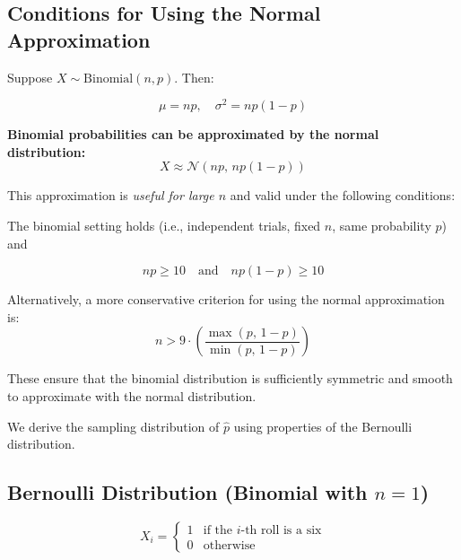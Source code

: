 \subsection*{Conditions for Using the Normal Approximation}

\vspace{0.5em}

Suppose \( X \sim \text{Binomial}(n, p) \). Then:

\[
\mu = np, \quad \sigma^2 = np(1 - p)
\]

\medskip

\textbf{Binomial probabilities can be approximated by the normal distribution:}
\[
X \approx \mathcal{N}(np, \, np(1 - p))
\]

This approximation is \textit{useful for large \( n \)} and valid under the following conditions:

\begin{tcolorbox}[title=Standard Conditions,
  colback=blue!5, 
  colframe=blue!50!black, 
  coltitle=black,
  colbacktitle=blue!20, %
  fonttitle=\bfseries,
  sharp corners=south,
  boxrule=0.5pt,
  enhanced,
  width=\textwidth,
  breakable]
The binomial setting holds (i.e., independent trials, fixed \( n \), same probability \( p \)) and

\[
np \geq 10 \quad \text{and} \quad np(1 - p) \geq 10
\]
\end{tcolorbox}

\vspace{0.5em}

Alternatively, a more conservative criterion for using the normal approximation is:
\[
n > 9 \cdot \left( \frac{\max(p, \, 1 - p)}{\min(p, \, 1 - p)} \right)
\]

\medskip

These ensure that the binomial distribution is sufficiently symmetric and smooth to approximate with the normal distribution.

\medskip
We derive the sampling distribution of \( \hat{p} \) using properties of the Bernoulli distribution.

\subsection*{Bernoulli Distribution (Binomial with $n = 1$)}

\[
X_i =
\begin{cases}
1 & \text{if the $i$-th roll is a six} \\
0 & \text{otherwise}
\end{cases}
\]

